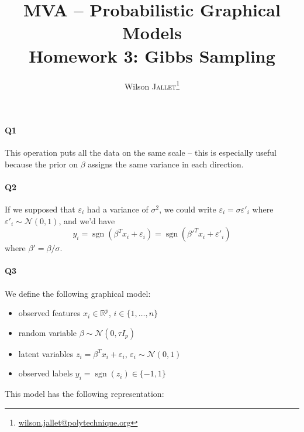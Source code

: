 \documentclass[11pt]{article}
\title{
	MVA -- Probabilistic Graphical Models\\
	{\color{NavyBlue}\sffamily Homework 3: Gibbs Sampling}
}
\author{
	Wilson \textsc{Jallet}\thanks{\url{wilson.jallet@polytechnique.org}}}
\newcommand\RR{\mathbb{R}}
\renewcommand{\epsilon}{\varepsilon}
\DeclareMathOperator{\sgn}{\mathrm{sgn}}
\newcommand{\calN}{\mathcal{N}}
\begin{document}
\maketitle


\paragraph{Q1} This operation puts all the data on the same scale -- this is especially useful because the prior on $\beta$ assigns the same variance in each direction.


\paragraph{Q2} If we supposed that $\epsilon_i$ had a variance of $\sigma^2$, we could write $\epsilon_i = \sigma \epsilon'_i$ where $\epsilon'_i \sim \calN(0,1)$, and we'd have
\[
	y_i = \sgn(\beta^T x_i + \epsilon_i) =
	\sgn({\beta'}^T x_i + \epsilon'_i)
\]
where $\beta' = \beta/\sigma$.


\paragraph{Q3} We define the following graphical model:
\begin{itemize}
	\item observed features $x_i \in \RR^p$, $i\in\{1,\ldots,n\}$
	\item random variable $\beta\sim \calN(0, \tau I_p)$
	\item latent variables $z_i = \beta^Tx_i + \epsilon_i$, $\epsilon_i \sim \calN(0,1)$
	\item observed labels $y_i = \sgn(z_i) \in \{-1,1\}$
\end{itemize}

This model has the following representation:
\begin{figure}[h]
	\centering
\end{figure}
\end{document}
